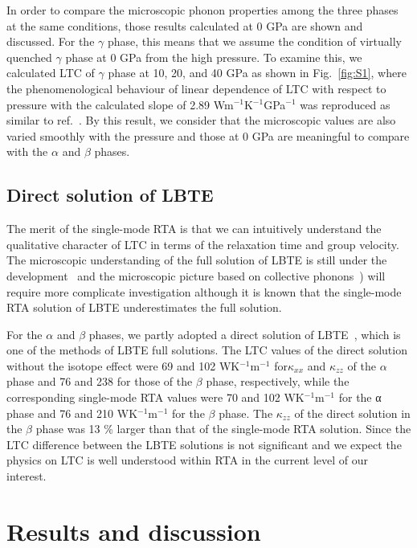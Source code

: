 \documentclass[twocolumn,amsmath,amssymb,a4paper,prb,superscriptaddress,floatfix]{revtex4-1}
\begin{document}
In order to compare the microscopic phonon properties among the three phases at
the same conditions, those results calculated at 0 GPa are shown and discussed.
For the $\gamma$ phase, this means that we assume the condition of virtually
quenched $\gamma$ phase at 0 GPa from the high pressure. To examine this, we
calculated LTC of $\gamma$ phase at 10, 20, and 40 GPa as shown in
Fig.~\ref{fig:S1}, where the phenomenological behaviour of linear dependence of
LTC with respect to pressure with the calculated slope of 2.89
Wm$^{-1}$K$^{-1}$GPa$^{-1}$ was reproduced as similar to
ref.~. By this result, we consider that the
microscopic values are also varied smoothly with the pressure and those at 0
GPa are meaningful to compare with the $\alpha$ and $\beta$ phases.

\subsection{Direct solution of LBTE}
The merit of the single-mode RTA is that we can intuitively understand the
qualitative character of LTC in terms of the relaxation time and group
velocity. The microscopic understanding of the full solution of LBTE is still
under the development~\cite{cepellotti-relaxons} and the microscopic picture
based on collective phonons~\cite{hardy-collective}) will require more
complicate investigation although it is known that the single-mode RTA solution
of LBTE underestimates the full solution.~\cite{mukhopadhyay-ltc,ward-ltc}


For the $\alpha$ and $\beta$ phases, we partly adopted a direct solution of
LBTE~\cite{chaput-direct}, which is one of the methods of LBTE full solutions.
The LTC values of the direct solution without the isotope effect were  69 and
102 WK$^{-1}$m$^{-1}$ for$\kappa_{xx}$ and $\kappa_{zz}$  of the $\alpha$ phase
and 76 and 238 for those of the $\beta$ phase, respectively, while the
corresponding single-mode RTA values were 70 and 102 WK$^{-1}$m$^{-1}$ for the
α phase and 76 and 210 WK$^{-1}$m$^{-1}$ for the $\beta$ phase. The
$\kappa_{zz}$ of the direct solution in the $\beta$ phase was 13 \% larger than
that of the single-mode RTA solution. Since the LTC difference between the LBTE
solutions is not significant and we expect the physics on LTC is well
understood within RTA in the current level of our interest.

\section{Results and discussion}
\end{document}
